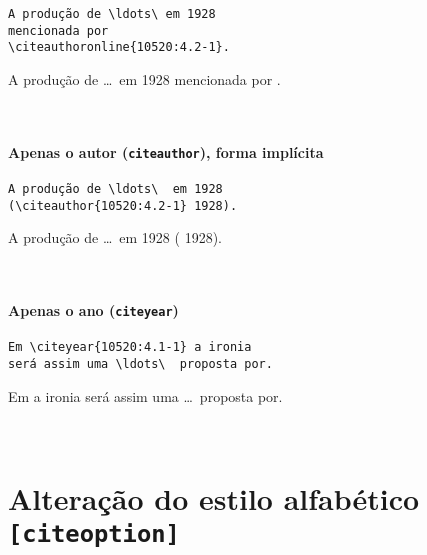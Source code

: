 \documentclass[espacosimples]{abnt}
\newcommand{\VerbL}{0.54\textwidth}
\newcommand{\LatL}{0.45\textwidth}
\begin{document}
\noindent\begin{minipage}[t]{\VerbL}\small\begin{verbatim}
A produção de \ldots\ em 1928
mencionada por
\citeauthoronline{10520:4.2-1}.
\end{verbatim}\end{minipage}\begin{minipage}[t]{\LatL}\small
A produção de \ldots\ em 1928  
mencionada por
.
\end{minipage}\vspace{5mm}\\

\subsubsection{Apenas o autor ({\tt citeauthor}), forma implícita}

\noindent\begin{minipage}[t]{\VerbL}\small\begin{verbatim}
A produção de \ldots\  em 1928
(\citeauthor{10520:4.2-1} 1928).
\end{verbatim}\end{minipage}\begin{minipage}[t]{\LatL}\small
A produção de \ldots\ em 1928
(\citeauthor{10520:4.2-1} 1928).
\end{minipage}\vspace{5mm}\\

\subsubsection{Apenas o ano ({\tt citeyear})}

\vspace{3mm}
\noindent\begin{minipage}[t]{\VerbL}\small\begin{verbatim}
Em \citeyear{10520:4.1-1} a ironia
será assim uma \ldots\  proposta por.
\end{verbatim}\end{minipage}\begin{minipage}[t]{\LatL}\small
Em \citeyear{10520:4.1-1} a ironia será assim uma \ldots\  proposta por.
\end{minipage}\vspace{5mm}\\


\chapter{Alteração do estilo alfabético {\tt [citeoption]}}
\end{document}
